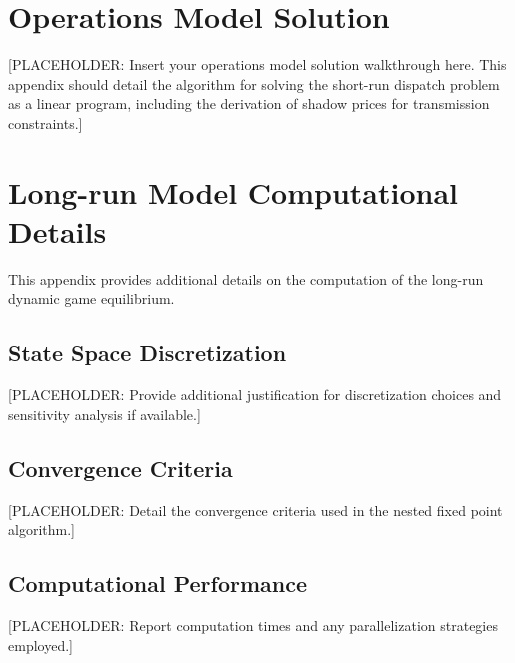 \documentclass[12pt]{article}
\begin{document}




\clearpage

\appendix

\section{Operations Model Solution} \label{sec:appendixa}

[PLACEHOLDER: Insert your operations model solution walkthrough here. This appendix should detail the algorithm for solving the short-run dispatch problem as a linear program, including the derivation of shadow prices for transmission constraints.]

\section{Long-run Model Computational Details} \label{sec:appendixb}

This appendix provides additional details on the computation of the long-run dynamic game equilibrium.

\subsection{State Space Discretization}

[PLACEHOLDER: Provide additional justification for discretization choices and sensitivity analysis if available.]

\subsection{Convergence Criteria}

[PLACEHOLDER: Detail the convergence criteria used in the nested fixed point algorithm.]

\subsection{Computational Performance}

[PLACEHOLDER: Report computation times and any parallelization strategies employed.]
\end{document}

